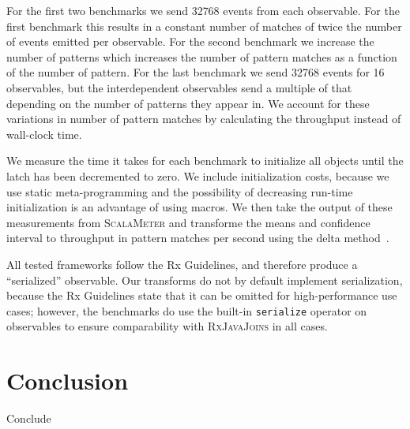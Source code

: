 \documentclass[runningheads]{llncs}
\begin{document}
\begin{sloppypar}
For the first two benchmarks we send 32768 events from each observable. For
the first benchmark this results in a constant number of matches of twice the
number of events emitted per observable. For the second benchmark we increase
the number of patterns which increases the number of pattern matches as a
function of the number of pattern. For the last benchmark we send 32768 events
for 16 observables, but the interdependent observables send a multiple of that
depending on the number of patterns they appear in. We account for these
variations in number of pattern matches by calculating the throughput instead
of wall-clock time.

We measure the time it takes for each benchmark to initialize all objects
until the latch has been decremented to zero. We include initialization costs,
because we use static meta-programming and the possibility of decreasing
run-time initialization is an advantage of using macros. We then take the output
of these measurements from \textsc{ScalaMeter} and transforme the means and
confidence interval to throughput in pattern matches per second using the
delta method~\cite{Casella:2002}.

All tested frameworks follow the Rx Guidelines, and therefore produce a
``serialized'' observable. Our transforms do not by default implement
serialization, because the Rx Guidelines state that it can be omitted for
high-performance use cases; however, the benchmarks do use the built-in
\texttt{serialize} operator on observables to ensure comparability with
\textsc{RxJavaJoins} in all cases.


\section{Conclusion}\label{sec:conclusion}

Conclude




\end{sloppypar}
\end{document}
